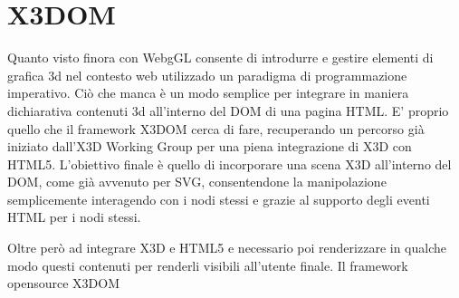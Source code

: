 \section{X3DOM}
Quanto visto finora con WebgGL consente di introdurre e gestire elementi di grafica 3d nel contesto web utilizzado un paradigma di programmazione imperativo. Ciò che manca è un modo semplice per integrare in maniera dichiarativa contenuti 3d all'interno del DOM di una pagina HTML. E' proprio quello che il framework X3DOM cerca di fare, recuperando un percorso già iniziato dall'X3D Working Group per una piena integrazione di X3D con HTML5. L'obiettivo finale è quello di incorporare una scena X3D all'interno del DOM, come già avvenuto per SVG, consentendone la manipolazione semplicemente interagendo con i nodi stessi e grazie al supporto degli eventi HTML per i nodi stessi.

Oltre però ad integrare X3D e HTML5 e necessario poi renderizzare in qualche modo questi contenuti per renderli visibili all'utente finale. Il framework opensource X3DOM 

